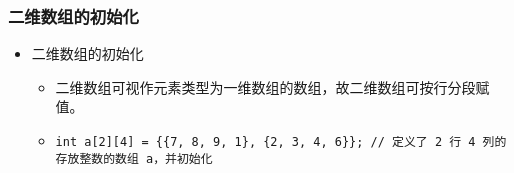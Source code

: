 \begin{frame}[fragile]
    \frametitle{二维数组的初始化}

    \begin{itemize}
        \item 二维数组的初始化
        \begin{itemize}[<+->]
            \item 二维数组可视作元素类型为一维数组的数组，故二维数组可按行分段赋值。
            \item \lstinline|int a[2][4] = {{7, 8, 9, 1}, {2, 3, 4, 6}}; // 定义了 2 行 4 列的存放整数的数组 a，并初始化|
        \end{itemize}
    \end{itemize}

    \begin{columns}



\end{columns}
\end{frame}

